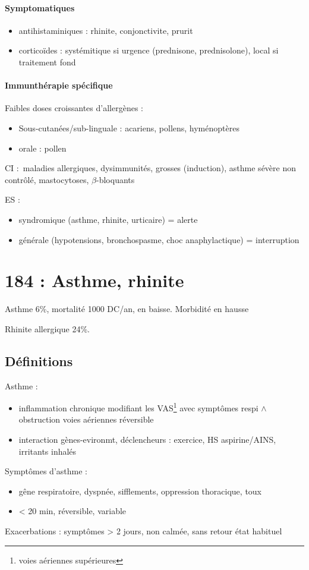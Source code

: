 \paragraph{Symptomatiques}
\begin{itemize}
  \item antihistaminiques : rhinite, conjonctivite, prurit
  \item corticoïdes : systémitique si urgence (prednisone, prednisolone), local
    si traitement fond
\end{itemize}

\paragraph{Immunthérapie spécifique}
Faibles doses croissantes d'allergènes :
\begin{itemize}
  \item Sous-cutanées/sub-linguale : acariens, pollens, hyménoptères
  \item orale : pollen
\end{itemize}
CI : maladies allergiques, dysimmunités, grosses (induction), asthme sévère non
contrôlé, mastocytoses, $\beta$-bloquants

ES : 
\begin{itemize}
  \item syndromique (asthme, rhinite, urticaire) = alerte
  \item générale (hypotensions, bronchospasme, choc anaphylactique) =
    interruption
\end{itemize}


\section{184 : Asthme, rhinite}
Asthme 6\%, mortalité 1000 DC/an, en baisse. Morbidité en hausse

Rhinite allergique 24\%.
\subsection{Définitions}
Asthme : 
\begin{itemize}
\item inflammation chronique modifiant les VAS\footnote{voies aériennes
supérieures} avec symptômes respi \(\wedge\) obstruction voies aériennes réversible
\item interaction gènes-evironmt, déclencheurs : exercice, HS aspirine/AINS,
irritants inhalés
\end{itemize}
Symptômes d'asthme : 
\begin{itemize}
\item gêne respiratoire, dyspnée, sifflements, oppression thoracique,
toux
\item < 20 min, réversible, variable
\end{itemize}
Exacerbations : \nearrow symptômes > 2 jours, non calmée, sans retour état
habituel

